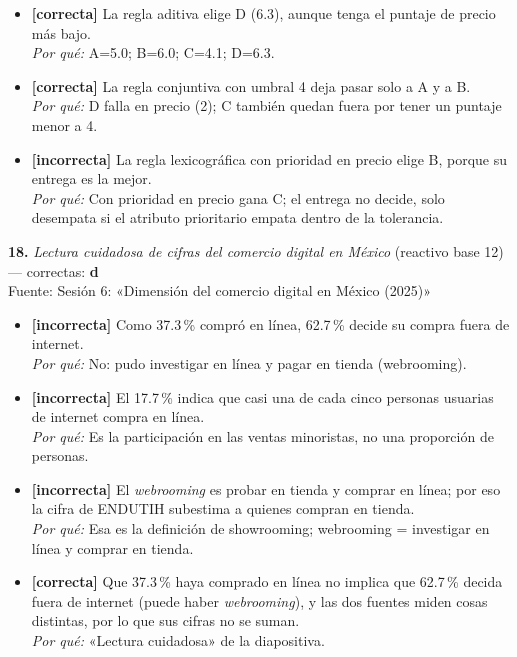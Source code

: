 \documentclass[10pt,letterpaper]{article}
\begin{document}
{\begin{itemize}[leftmargin=1.2em,itemsep=0pt,topsep=1pt,parsep=0pt]
\item[\textbf{b)}] {\footnotesize \textbf{[correcta]} La regla aditiva elige D (6.3), aunque tenga el puntaje de precio más bajo.\\ \textit{Por qué:} A=5.0; B=6.0; C=4.1; D=6.3.}
\item[\textbf{c)}] {\footnotesize \textbf{[correcta]} La regla conjuntiva con umbral 4 deja pasar solo a A y a B.\\ \textit{Por qué:} D falla en precio (2); C también quedan fuera por tener un puntaje menor a 4.}
\item[\textbf{d)}] {\footnotesize \textbf{[incorrecta]} La regla lexicográfica con prioridad en precio elige B, porque su entrega es la mejor.\\ \textit{Por qué:} Con prioridad en precio gana C; el entrega no decide, solo desempata si el atributo prioritario empata dentro de la tolerancia.}
\end{itemize}
\vspace{3pt}\noindent\textbf{18.} \textit{Lectura cuidadosa de cifras del comercio digital en México} (reactivo base 12) — correctas: \textbf{d}\\[-1pt]
{\scriptsize Fuente: Sesión 6: «Dimensión del comercio digital en México (2025)»}
\begin{itemize}[leftmargin=1.2em,itemsep=0pt,topsep=1pt,parsep=0pt]
\item[\textbf{a)}] {\footnotesize \textbf{[incorrecta]} Como 37.3\,\% compró en línea, 62.7\,\% decide su compra fuera de internet.\\ \textit{Por qué:} No: pudo investigar en línea y pagar en tienda (webrooming).}
\item[\textbf{b)}] {\footnotesize \textbf{[incorrecta]} El 17.7\,\% indica que casi una de cada cinco personas usuarias de internet compra en línea.\\ \textit{Por qué:} Es la participación en las ventas minoristas, no una proporción de personas.}
\item[\textbf{c)}] {\footnotesize \textbf{[incorrecta]} El \textit{webrooming} es probar en tienda y comprar en línea; por eso la cifra de ENDUTIH subestima a quienes compran en tienda.\\ \textit{Por qué:} Esa es la definición de showrooming; webrooming = investigar en línea y comprar en tienda.}
\item[\textbf{d)}] {\footnotesize \textbf{[correcta]} Que 37.3\,\% haya comprado en línea no implica que 62.7\,\% decida fuera de internet (puede haber \textit{webrooming}), y las dos fuentes miden cosas distintas, por lo que sus cifras no se suman.\\ \textit{Por qué:} «Lectura cuidadosa» de la diapositiva.}

\end{itemize}}
\end{document}
